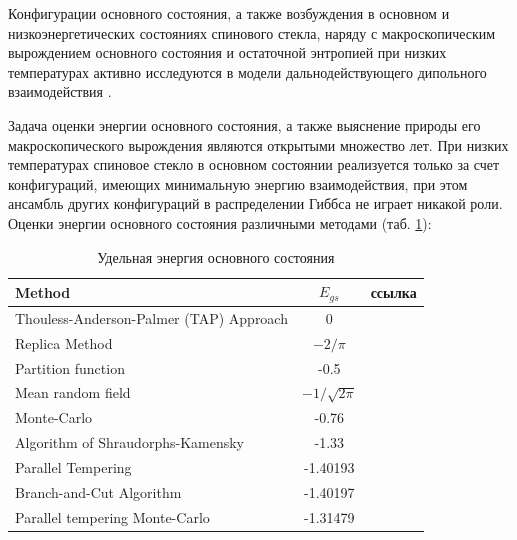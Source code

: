 \documentclass[utf8, babel, sor, jor, amsmath, amssymb, reprint]{elsarticle} %
\begin{document}
Конфигурации основного состояния, а также возбуждения в основном и низкоэнергетических состояниях спинового стекла, наряду с макроскопическим вырождением основного состояния и остаточной энтропией  при низких температурах активно исследуются в модели дальнодействующего дипольного взаимодействия \cite{makarova2021low, singh2024micromagnetic}.

Задача оценки энергии основного состояния, а также выяснение природы его макроскопического вырождения являются открытыми множество лет. При низких температурах спиновое стекло в основном состоянии реализуется только за счет конфигураций, имеющих минимальную энергию взаимодействия, при этом ансамбль других конфигураций в распределении Гиббса не играет никакой роли. Оценки энергии основного состояния различными методами (таб. \ref{tab:Egs}):

\begin{table}[!h]
	\begin{tabular}{|l|c|l|}
		\hline
		Method                                   & $E_{gs}$                                       & ссылка                                          \\ \hline
		Thouless-Anderson-Palmer (TAP) Approach & 0                                              & \cite{thouless1977solution}    \\ \hline
		Replica Method                            & $-2/\pi$                                       & \cite{sherrington1975solvable} \\ \hline
		Partition function                      & -0.5                                           & \cite{tanaka1980analytic}      \\ \hline
		Mean random field                       & $-1/\sqrt{2\pi}$                               & \cite{klein1976comparison}     \\ \hline
		Monte-Carlo                             & -0.76                                          & \cite{kirkpatrick1978infinite} \\ \hline
		Algorithm of Shraudorphs-Kamensky        & -1.33                                          & \cite{karandashev2019global}   \\ \hline
		Parallel Tempering   & -1.40193                                       & \cite{palmer1999ground}        \\ \hline
		  Branch-and-Cut Algorithm              & -1.40197                         
		                                        & \cite{campbell2004energy}      \\ \hline
	
		Parallel tempering Monte-Carlo  & -1.31479                                       & \cite{roma2009ground}          \\ \hline
		
	
		
	\end{tabular}
	\label{tab:Egs}
	\caption{Удельная энергия основного состояния}
\end{table}
\end{document}
